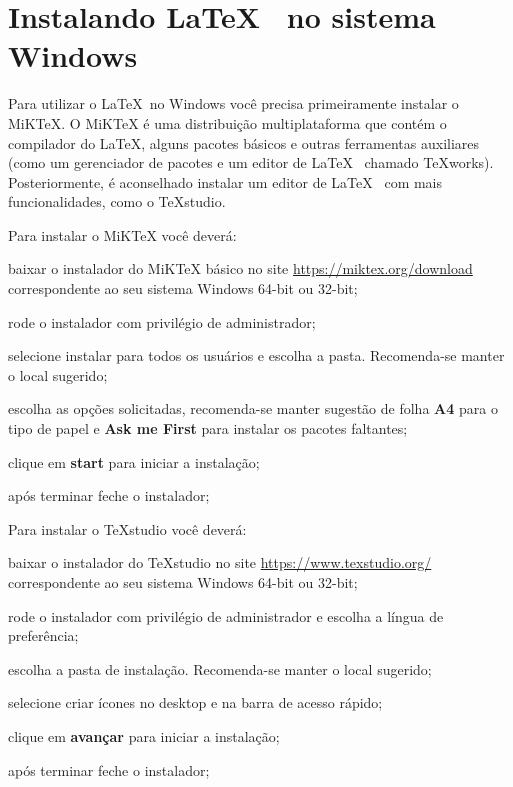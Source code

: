 \section{Instalando \LaTeX~ no sistema Windows}

Para utilizar o \LaTeX~no Windows você precisa primeiramente instalar o MiKTeX. O MiKTeX é uma distribuição multiplataforma que contém o compilador do \LaTeX, alguns pacotes básicos e outras ferramentas auxiliares (como um gerenciador de pacotes e um editor de \LaTeX~ chamado TeXworks). Posteriormente, é aconselhado instalar um editor de \LaTeX~ com mais funcionalidades, como o TeXstudio.

Para instalar o MiKTeX você deverá:

\begin{alineas}
	
	\item baixar o instalador do MiKTeX básico no site \url{https://miktex.org/download} correspondente ao seu sistema Windows 64-bit ou 32-bit;
	
	\item rode o instalador com privilégio de administrador;
	
	\item selecione instalar para todos os usuários e escolha a pasta. Recomenda-se manter o local sugerido;
	
	\item escolha as opções solicitadas, recomenda-se manter sugestão de folha \textbf{A4} para o tipo de papel e \textbf{Ask me First} para instalar os pacotes faltantes;
	
	\item clique em \textbf{start} para iniciar a instalação;
	
	\item após terminar feche o instalador;
	
\end{alineas}

Para instalar o TeXstudio você deverá:

\begin{alineas}
	
	\item baixar o instalador do TeXstudio no site \url{https://www.texstudio.org/} correspondente ao seu sistema Windows 64-bit ou 32-bit;
	
	\item rode o instalador com privilégio de administrador e escolha a língua de preferência;
	
	\item escolha a pasta de instalação. Recomenda-se manter o local sugerido;
	
	\item selecione criar ícones no desktop e na barra de acesso rápido;
	
	\item clique em \textbf{avançar} para iniciar a instalação;
	
	\item após terminar feche o instalador;
	
\end{alineas}

